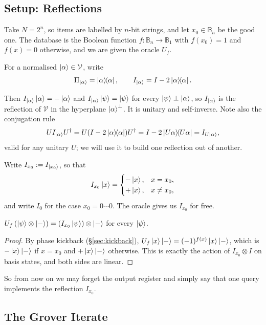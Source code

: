 \documentclass[a4paper]{scrartcl}
\newcommand{\Vs}{\mathcal{V}}
\newcommand{\bits}[1]{\mathbb{B}_{#1}}
\begin{document}
\subsection{Setup: Reflections}

Take $N = 2^n$, so items are labelled by $n$-bit strings, and let $x_0\in\bits n$ be the good one. The database is the Boolean function $f:\bits n\to\bits1$ with $f(x_0)=1$ and $f(x)=0$ otherwise, and we are given the oracle $U_f$.

\begin{definition}
	For a normalised $\ket\alpha\in\Vs$, write
	$$\Pi_{\ket\alpha} = \op{\alpha}{\alpha}, \qquad I_{\ket\alpha} = I - 2\op{\alpha}{\alpha}.$$
\end{definition}

Then $I_{\ket\alpha}\ket\alpha = -\ket\alpha$ and $I_{\ket\alpha}\ket\psi = \ket\psi$ for every $\ket\psi\perp\ket\alpha$, so $I_{\ket\alpha}$ is the reflection of $\Vs$ in the hyperplane $\ket\alpha^\perp$. It is unitary and self-inverse. Note also the conjugation rule
$$UI_{\ket\alpha}U^\dagger = U(I - 2\op{\alpha}{\alpha})U^\dagger = I - 2\op{U\alpha}{U\alpha} = I_{U\ket\alpha},$$
valid for any unitary $U$; we will use it to build one reflection out of another.

Write $I_{x_0} := I_{\ket{x_0}}$, so that
$$I_{x_0}\ket x = \begin{cases} -\ket x, & x = x_0,\\ +\ket x, &x\neq x_0,\end{cases}$$
and write $I_0$ for the case $x_0 = 0\cdots0$. The oracle gives us $I_{x_0}$ for free.

\begin{proposition}
	$U_f\left(\ket\psi\otimes\ket-\right) = \left(I_{x_0}\ket\psi\right)\otimes\ket-$ for every $\ket\psi$.
\end{proposition}

\begin{proof}
	By phase kickback (\S\ref{sec:kickback}), $U_f\ket x\ket- = (-1)^{f(x)}\ket x\ket-$, which is $-\ket{x}\ket-$ if $x = x_0$ and $+\ket x\ket-$ otherwise. This is exactly the action of $I_{x_0}\otimes I$ on basis states, and both sides are linear.
\end{proof}

So from now on we may forget the output register and simply say that one query implements the reflection $I_{x_0}$.

\subsection{The Grover Iterate}
\end{document}
